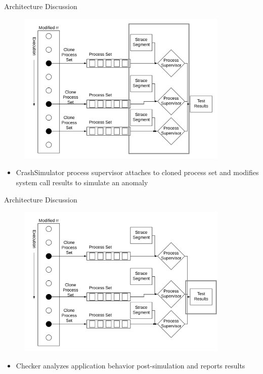 \documentclass[pdf]{beamer}
\begin{document}
\begin{frame}{Architecture Discussion}
  \begin{figure}
    \centering
    \includegraphics[width = 0.9\textwidth]{images/architecture_mutator_supervisor}
  \end{figure}
  \begin{itemize}
    \item{CrashSimulator process supervisor attaches to cloned process set
      and modifies system call results to simulate an anomaly}
  \end{itemize}
\end{frame}


\begin{frame}{Architecture Discussion}
  \begin{figure}
    \centering
    \includegraphics[width = 0.9\textwidth]{images/architecture_checker_results}
  \end{figure}
  \begin{itemize}
    \item{Checker analyzes application behavior post-simulation and reports
      results}
  \end{itemize}
\end{frame}
\end{document}
